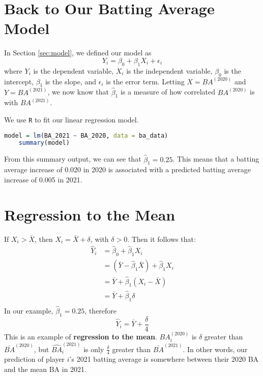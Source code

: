 \documentclass[twoside]{article}
\theoremstyle{definition}
\begin{document}
\section{Back to Our Batting Average Model}

In Section \ref{sec:model}, we defined our model as 
\begin{equation}
    Y_i = \beta_0 + \beta_1 X_i + \epsilon_i
\end{equation}
where $Y_i$ is the dependent variable, $X_i$ is the independent variable, $\beta_0$ is the intercept, $\beta_1$ is the slope, and $\epsilon_i$ is the error term. Letting $X = BA^{(2020)}$ and $Y = BA^{(2021)}$, we now know that $\widehat{\beta}_1$ is a measure of how correlated $BA^{(2020)}$ is with $BA^{(2021)}$.

We use \texttt{R} to fit our linear regression model.
\begin{lstlisting}[language=R]
    model = lm(BA_2021 ~ BA_2020, data = ba_data)
    summary(model)
\end{lstlisting}
From this summary output, we can see that $\widehat{\beta}_1 = 0.25$. This means that a batting average increase of 0.020 in 2020 is associated with a predicted batting average increase of 0.005 in 2021.

\section{Regression to the Mean}

If $X_i > \bar{X}$, then $X_i = \bar{X} + \delta$, with $\delta > 0$. Then it follows that:
\begin{align}
    \widehat{Y}_i &= \widehat{\beta}_0 + \widehat{\beta}_1 X_i \nonumber \\
    &= (\bar{Y} - \widehat{\beta}_1 \bar{X}) + \widehat{\beta}_1 X_i \nonumber \\
    &= \bar{Y} + \widehat{\beta}_1 (X_i - \bar{X}) \nonumber \\
    &= \bar{Y} + \widehat{\beta}_1 \delta \\
\end{align}
In our example, $\widehat{\beta}_1 = 0.25$, therefore
\begin{equation}
    \widehat{Y}_i = \bar{Y} + \frac{\delta}{4}
\end{equation}
This is an example of \textbf{regression to the mean}. $BA_i^{(2020)}$ is $\delta$ greater than $\bar{BA}^{(2020)}$, but $\widehat{BA}_i^{(2021)}$ is only $\frac{\delta}{4}$ greater than $\bar{BA}^{(2021)}$. In other words, our prediction of player $i$'s 2021 batting average is somewhere between their 2020 BA and the mean BA in 2021.
\end{document}
